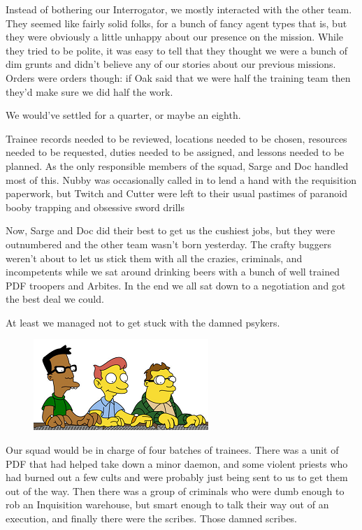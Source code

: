 Instead of bothering our Interrogator, we mostly interacted with the other team. 
They seemed like fairly solid folks, for a bunch of fancy agent types that is, but they were obviously a little unhappy about our presence on the mission. 
While they tried to be polite, it was easy to tell that they thought we were a bunch of dim grunts and didn’t believe any of our stories about our previous missions. 
Orders were orders though: 
if Oak said that we were half the training team then they’d make sure we did half the work. 


We would’ve settled for a quarter, or maybe an eighth.

Trainee records needed to be reviewed, locations needed to be chosen, resources needed to be requested, duties needed to be assigned, and lessons needed to be planned. 
As the only responsible members of the squad, Sarge and Doc handled most of this. 
Nubby was occasionally called in to lend a hand with the requisition paperwork, but Twitch and Cutter were left to their usual pastimes of paranoid booby trapping and obsessive sword drills 

Now, Sarge and Doc did their best to get us the cushiest jobs, but they were outnumbered and the other team wasn’t born yesterday. 
The crafty buggers weren’t about to let us stick them with all the crazies, criminals, and incompetents while we sat around drinking beers with a bunch of well trained PDF troopers and Arbites. 
In the end we all sat down to a negotiation and got the best deal we could.

At least we managed not to get stuck with the damned psykers.

\begin{figure}
	\begin{center}
		\includegraphics[width=\figwidth]{pics/8/6.png}
	\end{center}
\end{figure}
Our squad would be in charge of four batches of trainees. 
There was a unit of PDF that had helped take down a minor daemon, and some violent priests who had burned out a few cults and were probably just being sent to us to get them out of the way. 
Then there was a group of criminals who were dumb enough to rob an Inquisition warehouse, but smart enough to talk their way out of an execution, and finally there were the scribes. 
Those damned scribes.

